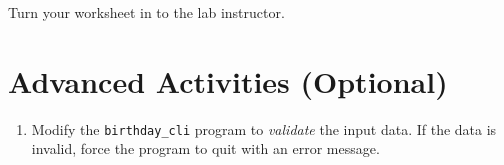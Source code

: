 \documentclass[12pt]{scrartcl}
\begin{document}
Turn your worksheet in to the lab instructor.

\section{Advanced Activities (Optional)}

\begin{enumerate}
  \item Modify the \texttt{birthday_cli} program to \emph{validate} the
  	input data.  If the data is invalid, force the program to quit with an error
	message.
%
\end{enumerate}
\end{document}
